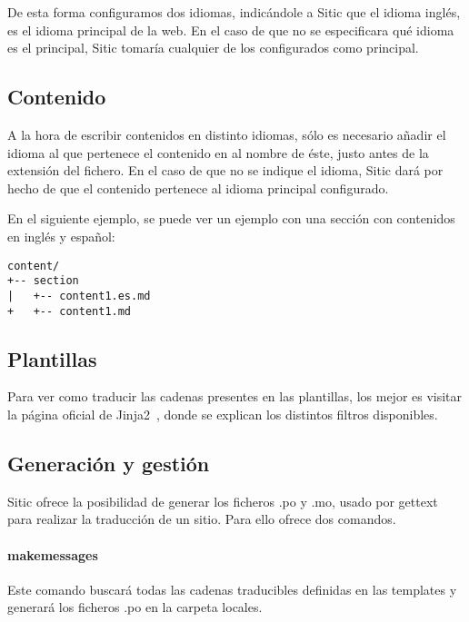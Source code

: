 De esta forma configuramos dos idiomas, indicándole a Sitic que el idioma inglés, es el idioma principal
de la web. En el caso de que no se especificara qué idioma es el principal, Sitic tomaría cualquier de
los configurados como principal.

\subsection{Contenido}

A la hora de escribir contenidos en distinto idiomas, sólo es necesario añadir el idioma al que pertenece el
contenido en al nombre de éste, justo antes de la extensión del fichero. En el caso de que no se indique el
idioma, Sitic dará por hecho de que el contenido pertenece al idioma principal configurado.

En el siguiente ejemplo, se puede ver un ejemplo con una sección con contenidos en inglés y español:

\begin{verbatim}
content/
+-- section
|   +-- content1.es.md
+   +-- content1.md
\end{verbatim}

\subsection{Plantillas}

Para ver como traducir las cadenas presentes en las plantillas, los mejor es visitar la página oficial de
Jinja2~\cite{jinja}, donde se explican los distintos filtros disponibles.

\subsection{Generación y gestión}

Sitic ofrece la posibilidad de generar los ficheros .po y .mo, usado por gettext para realizar la traducción
de un sitio. Para ello ofrece dos comandos.

\paragraph{makemessages}

Este comando buscará todas las cadenas traducibles definidas en las templates y generará los ficheros .po
en la carpeta locales.


